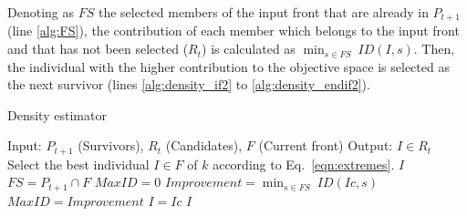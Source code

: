 %
Denoting as $FS$ the selected members of the input front that are already in $P_{t+1}$ (line \ref{alg:FS}), the contribution of each member which belongs to the input front and that has not been selected ($R_t$) is calculated as $\displaystyle{\min_{s \in FS}\ ID(I, s)}$.
%
Then, the individual with the higher contribution to the objective space is selected as the next survivor (lines \ref{alg:density_if2} to \ref{alg:density_endif2}).%

\begin{algorithm}[t]
	\caption{Density estimator} 
\begin{small}
\begin{algorithmic}[1]
\STATE Input: $P_{t+1}$ (Survivors), $R_t$ (Candidates), $F$ (Current front)
    	\STATE Output: $I \in R_t$ 
        \label{alg:density_for}
	      \STATE Select the best individual $I \in F$ of $k$ according to Eq.~\ref{eqn:extremes}.\label{alg:density_1}
	  	 \RETURN $I$ \label{alg:density_2}
	  	\ENDIF
	\ENDFOR\label{alg:density_endfor}
	\STATE $FS = P_{t+1} \cap F$ \label{alg:FS}
	\STATE $MaxID = 0$ \label{alg:density_for2}
	\STATE $Improvement = \displaystyle{\min_{s \in FS}\ ID(Ic, s)}$ 
	 \label{alg:density_if2}
	   \STATE $MaxID = Improvement$
	   \STATE $I = Ic$ 
	\ENDIF \label{alg:density_endif2}
	\ENDFOR	\label{alg:density_endfor2}
    	\RETURN $I$ \label{alg:density_4}
	\end{algorithmic}
\end{small}
\label{alg:Density_Estimator}
\end{algorithm}


%
%
%
%

%
%

